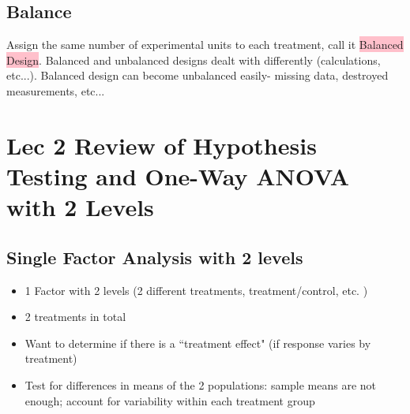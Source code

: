 \documentclass[a4paper,11pt]{article}
\begin{document}
\subsection{Balance}
Assign the same number of experimental units to each treatment, call it \colorbox{pink}{Balanced Design}. Balanced and unbalanced designs dealt with differently (calculations, etc...). Balanced design can become unbalanced easily- missing data, destroyed measurements, etc...

\newpage

\section{Lec 2 Review of Hypothesis Testing and One-Way ANOVA with 2 Levels}
\subsection{Single Factor Analysis with 2 levels}
\begin{itemize}
\item 1 Factor with 2 levels (2 different treatments, treatment/control, etc. )
\item 2 treatments in total
\item Want to determine if there is a ``treatment effect" (if response varies by treatment)
\item Test for differences in means of the 2 populations: sample means are not enough; account for variability within each treatment group
\end{itemize}
\end{document}
